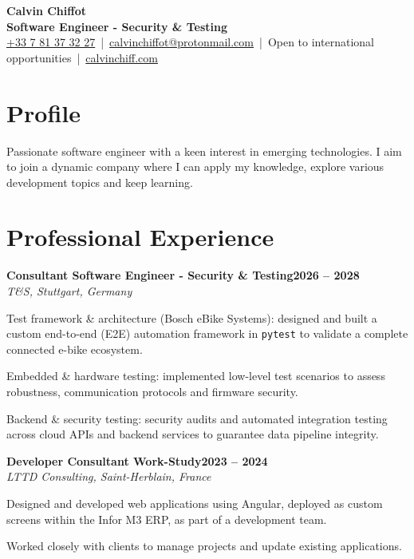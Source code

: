 \documentclass[10pt,a4paper]{article}
\newcommand{\cventry}[3]{%
	\vspace{3pt}%
	\noindent\textbf{#1}\hfill\textbf{#2}\\[1pt]
	\noindent\hspace{1.2em}\textit{#3}\par\vspace{1pt}%
}
\begin{document}
\pagestyle{empty}

\begin{center}
	{\huge \textbf{Calvin Chiffot}}\\[4pt]
	{\large \textbf{Software Engineer - Security \& Testing}}\\[6pt]
	\small
	\href{tel:+33781373227}{+33 7 81 37 32 27} \,|\, 
	\href{mailto:calvinchiffot@protonmail.com}{calvinchiffot@protonmail.com} \,|\, 
	Open to international opportunities \,|\, 
	\href{https://calvinchiff.com}{calvinchiff.com}
\end{center}

\section{Profile}
Passionate software engineer with a keen interest in emerging technologies. I aim to join a dynamic company where I can apply my knowledge, explore various development topics and keep learning.

\section{Professional Experience}

\cventry{Consultant Software Engineer - Security \& Testing}{2026 -- 2028}{T\&S, Stuttgart, Germany}
\begin{cvlist}
	\item Test framework \& architecture (Bosch eBike Systems): designed and built a custom end-to-end (E2E) automation framework in \texttt{pytest} to validate a complete connected e-bike ecosystem.
	\item Embedded \& hardware testing: implemented low-level test scenarios to assess robustness, communication protocols and firmware security.
	\item Backend \& security testing: security audits and automated integration testing across cloud APIs and backend services to guarantee data pipeline integrity.
\end{cvlist}

\cventry{Developer Consultant Work-Study}{2023 -- 2024}{LTTD Consulting, Saint-Herblain, France}
\begin{cvlist}
	\item Designed and developed web applications using Angular, deployed as custom screens within the Infor M3 ERP, as part of a development team.
	\item Worked closely with clients to manage projects and update existing applications.
\end{cvlist}
\end{document}
